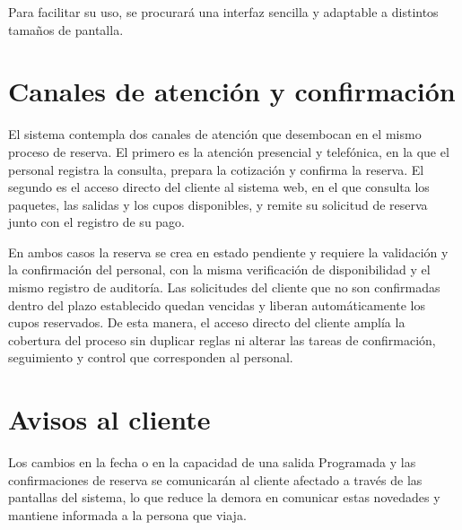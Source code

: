Para facilitar su uso, se procurará una interfaz sencilla y adaptable a
distintos tamaños de pantalla.

\section{Canales de atención y confirmación}

El sistema contempla dos canales de atención que desembocan en el mismo
proceso de reserva. El primero es la atención presencial y telefónica, en la
que el personal registra la consulta, prepara la cotización y confirma la
reserva. El segundo es el acceso directo del cliente al sistema web, en el que
consulta los paquetes, las salidas y los cupos disponibles, y remite su
solicitud de reserva junto con el registro de su pago.

En ambos casos la reserva se crea en estado pendiente y requiere la validación
y la confirmación del personal, con la misma verificación de disponibilidad y
el mismo registro de auditoría. Las solicitudes del cliente que no son
confirmadas dentro del plazo establecido quedan vencidas y liberan
automáticamente los cupos reservados. De esta manera, el acceso directo del
cliente amplía la cobertura del proceso sin duplicar reglas ni alterar las
tareas de confirmación, seguimiento y control que corresponden al personal.

\section{Avisos al cliente}

Los cambios en la fecha o en la capacidad de una salida Programada y las
confirmaciones de reserva se comunicarán al cliente afectado a través de las
pantallas del sistema, lo que reduce la demora en comunicar estas novedades y
mantiene informada a la persona que viaja.

